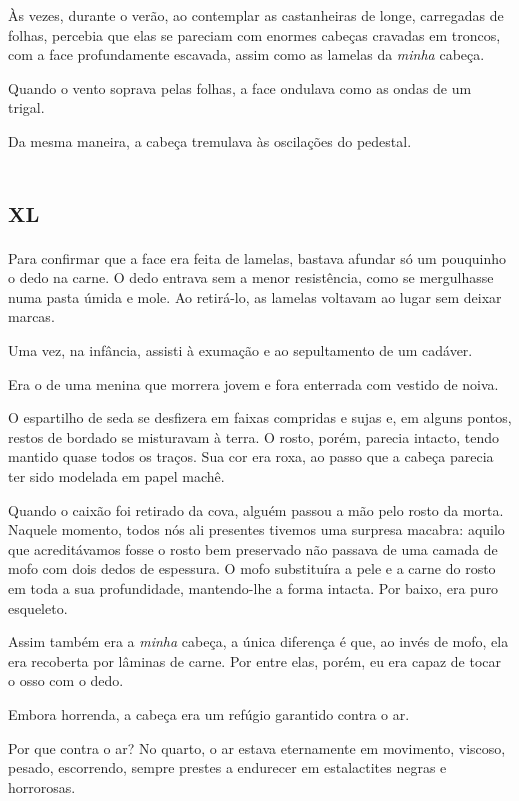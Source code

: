Às vezes, durante o verão, ao contemplar as castanheiras de longe, carregadas de folhas, percebia que elas se pareciam com enormes cabeças cravadas em troncos, com a face profundamente escavada, assim como as lamelas da \textit{minha} cabeça.

Quando o vento soprava pelas folhas, a face ondulava como as ondas de um trigal.

Da mesma maneira, a cabeça tremulava às oscilações do pedestal.


\chapter*{\huge\centering\textsc{xl}}

Para confirmar que a face era feita de lamelas, bastava afundar só um pouquinho o dedo na carne. O dedo entrava sem a menor resistência, como se mergulhasse numa pasta úmida e mole. Ao retirá-lo, as lamelas voltavam ao lugar sem deixar marcas.

Uma vez, na infância, assisti à exumação e ao sepultamento de um cadáver.

Era o de uma menina que morrera jovem e fora enterrada com vestido de noiva. 

O espartilho de seda se desfizera em faixas compridas e sujas e, em alguns pontos, restos de bordado se misturavam à terra. O rosto, porém, parecia intacto, tendo mantido quase todos os traços. Sua cor era roxa, ao passo que a cabeça parecia ter sido modelada em papel machê.

Quando o caixão foi retirado da cova, alguém passou a mão pelo rosto da morta. Naquele momento, todos nós ali presentes tivemos uma surpresa macabra: aquilo que acreditávamos fosse o rosto bem preservado não passava de uma camada de mofo com dois dedos de espessura. O mofo substituíra a pele e a carne do rosto em toda a sua profundidade, mantendo-lhe a forma intacta. Por baixo, era puro esqueleto.

Assim também era a \textit{minha} cabeça, a única diferença é que, ao invés de mofo, ela era recoberta por lâminas de carne. Por entre elas, porém, eu era capaz de tocar o osso com o dedo.

Embora horrenda, a cabeça era um refúgio garantido contra o ar.

Por que contra o ar? No quarto, o ar estava eternamente em movimento, viscoso, pesado, escorrendo, sempre prestes a endurecer em estalactites negras e horrorosas.

